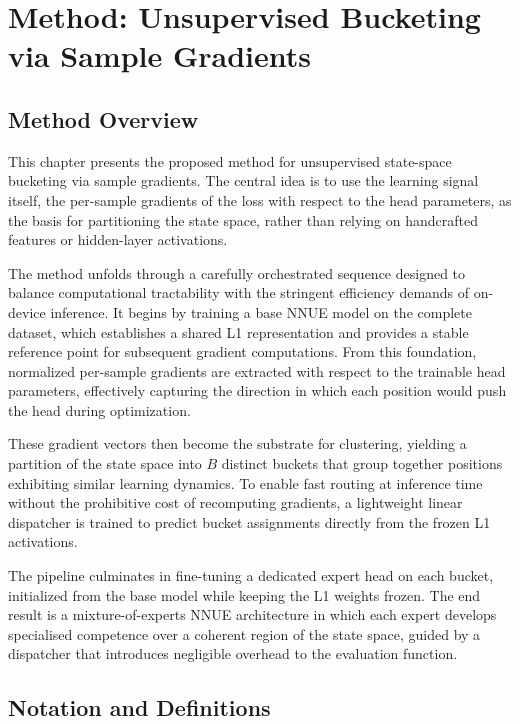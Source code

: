 \chapter[Method]{Method: Unsupervised Bucketing via Sample Gradients}\label{ch:method}

\section{Method Overview}\label{sec:method-overview}

This chapter presents the proposed method for unsupervised state-space bucketing via sample gradients. The central idea is to use the learning signal itself, the per-sample gradients of the loss with respect to the head parameters, as the basis for partitioning the state space, rather than relying on handcrafted features or hidden-layer activations.

The method unfolds through a carefully orchestrated sequence designed to balance computational tractability with the stringent efficiency demands of on-device inference. It begins by training a base NNUE model on the complete dataset, which establishes a shared L1 representation and provides a stable reference point for subsequent gradient computations. From this foundation, normalized per-sample gradients are extracted with respect to the trainable head parameters, effectively capturing the direction in which each position would push the head during optimization.

These gradient vectors then become the substrate for clustering, yielding a partition of the state space into \(B\) distinct buckets that group together positions exhibiting similar learning dynamics. To enable fast routing at inference time without the prohibitive cost of recomputing gradients, a lightweight linear dispatcher is trained to predict bucket assignments directly from the frozen L1 activations.

The pipeline culminates in fine-tuning a dedicated expert head on each bucket, initialized from the base model while keeping the L1 weights frozen. The end result is a mixture-of-experts NNUE architecture in which each expert develops specialised competence over a coherent region of the state space, guided by a dispatcher that introduces negligible overhead to the evaluation function.

\section{Notation and Definitions}\label{sec:notation}

